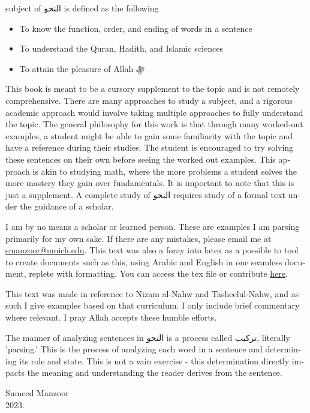 \documentclass[../main.tex]{subfiles}
\begin{document}
\begin{english}
     subject of \textarabic{النحو} is defined as the following
    \begin{itemize}
        \item To know the function, order, and ending of words in a sentence
        \item To understand the Quran, Hadith, and Islamic sciences
        \item To attain the pleasure of Allah ﷻ
    \end{itemize}
    This book is meant to be a cursory supplement to the topic and is not remotely comprehensive. There are many approaches to study a subject, and a rigorous academic approach would involve taking multiple approaches to fully understand the topic. The general philosophy for this work is that through many worked-out examples, a student might be able to gain some familiarity with the topic and have a reference during their studies. The student is encouraged to try solving these sentences on their own before seeing the worked out examples. This approach is akin to studying math, where the more problems a student solves the more mastery they gain over fundamentals. It is important to note that this is just a supplement. A complete study of \textarabic{النحو} requires study of a formal text under the guidance of a scholar.

    I am by no means a scholar or learned person. These are examples I am parsing primarily for my own sake. If there are any mistakes, please email me at \href{mailto:smanzoor@umich.edu}{smanzoor@umich.edu}. This text was also a foray into latex as a possible to tool to create documents such as this, using Arabic and English in one seamless document, replete with formatting. You can access the tex file or contribute \href{https://github.com/Yoyomanzoor/alnahw-bilmiran}{here}.

    This text was made in reference to Nizam al-Nahw\supercite{nizam} and Tasheelul-Nahw\supercite{tasheel}, and as such I give examples based on that curriculum. I only include brief commentary where relevant. I pray Allah accepts these humble efforts.
    
    The manner of analyzing sentences in \textarabic{النحو} is a process called \textarabic{تركيب}, literally 'parsing.' This is the process of analyzing each word in a sentence and determining its role and state. This is not a vain exercise - this determination directly impacts the meaning and understanding the reader derives from the sentence.
    
    Sumeed Manzoor\\
    2023.
\end{english}

\pagebreak
\end{document}
